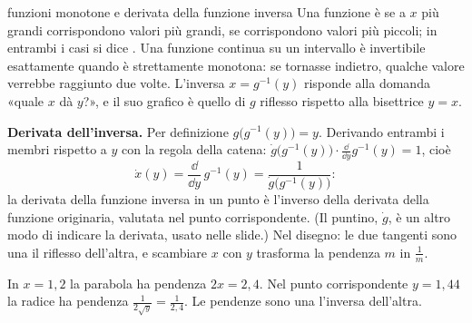 \begin{richiamo}{funzioni monotone e derivata della funzione inversa}
Una funzione è  se a $x$ più grandi corrispondono valori più grandi,  se corrispondono valori più piccoli; in entrambi i casi si dice . Una funzione
continua su un intervallo è invertibile esattamente quando è strettamente monotona: se tornasse indietro, qualche
valore verrebbe raggiunto due volte. L'inversa $x = g^{-1}(y)$ risponde alla domanda «quale $x$ dà $y$?», e il suo
grafico è quello di $g$ riflesso rispetto alla bisettrice $y = x$.

\textbf{Derivata dell'inversa.} Per definizione $g\big(g^{-1}(y)\big) = y$. Derivando entrambi i membri rispetto a $y$
con la regola della catena: $\dot g\big(g^{-1}(y)\big) \cdot \frac{\dd}{\dd y} g^{-1}(y) = 1$, cioè
\[ \dot x(y) = \frac{\dd}{\dd y}\, g^{-1}(y) = \frac{1}{\dot g\big(g^{-1}(y)\big)} : \]
la derivata della funzione inversa in un punto è l'inverso della derivata della funzione originaria, valutata nel punto
corrispondente. (Il puntino, $\dot g$, è un altro modo di indicare la derivata, usato nelle slide.) Nel disegno: le due
tangenti sono una il riflesso dell'altra, e scambiare $x$ con $y$ trasforma la pendenza $m$ in $\frac1m$.
\begin{center}
\hspace{0.5cm}
\begin{minipage}[b]{6.6cm}\small
In $x = 1{,}2$ la parabola ha pendenza $2x = 2{,}4$. Nel punto corrispondente $y = 1{,}44$ la radice ha pendenza
$\frac{1}{2\sqrt{y}} = \frac{1}{2{,}4}$. Le pendenze sono una l'inversa dell'altra.
\end{minipage}
\end{center}
\end{richiamo}

